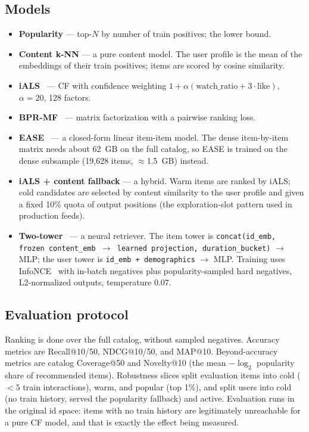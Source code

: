 \documentclass[11pt,a4paper]{article}
\begin{document}
\subsection{Models}
\begin{itemize}
  \item \textbf{Popularity} --- top-$N$ by number of train positives; the lower bound.
  \item \textbf{Content k-NN} --- a pure content model. The user profile is the mean of
        the embeddings of their train positives; items are scored by cosine similarity.
  \item \textbf{iALS}~\cite{hu2008} --- CF with confidence weighting
        $1 + \alpha(\text{watch\_ratio} + 3\cdot\text{like})$, $\alpha=20$, 128 factors.
  \item \textbf{BPR-MF}~\cite{rendle2009} --- matrix factorization with a pairwise
        ranking loss.
  \item \textbf{EASE}~\cite{steck2019} --- a closed-form linear item-item model. The
        dense item-by-item matrix needs about 62~GB on the full catalog, so EASE is
        trained on the dense subsample (19{,}628 items, $\approx$1.5~GB) instead.
  \item \textbf{iALS + content fallback} --- a hybrid. Warm items are ranked by iALS;
        cold candidates are selected by content similarity to the user profile and given
        a fixed 10\% quota of output positions (the exploration-slot pattern used in
        production feeds).
  \item \textbf{Two-tower}~\cite{covington2016} --- a neural retriever. The item tower is
        \texttt{concat(id\_emb, frozen content\_emb $\to$ learned projection,
        duration\_bucket)} $\to$ MLP; the user tower is \texttt{id\_emb + demographics}
        $\to$ MLP. Training uses InfoNCE~\cite{oord2018} with in-batch negatives plus
        popularity-sampled hard negatives, L2-normalized outputs, temperature 0.07.
\end{itemize}

\subsection{Evaluation protocol}
Ranking is done over the full catalog, without sampled negatives. Accuracy metrics are
Recall@10/50, NDCG@10/50, and MAP@10. Beyond-accuracy metrics are catalog Coverage@50
and Novelty@10 (the mean $-\log_2$ popularity share of recommended items). Robustness
slices split evaluation items into cold ($<5$ train interactions), warm, and popular
(top 1\%), and split users into cold (no train history, served the popularity fallback)
and active. Evaluation runs in the original id space: items with no train history are
legitimately unreachable for a pure CF model, and that is exactly the effect being
measured.
\end{document}

